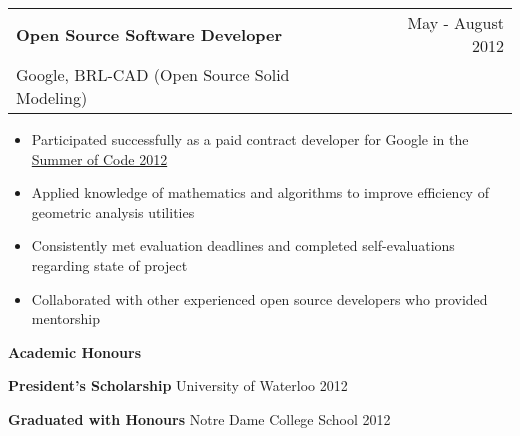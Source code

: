 \documentclass[10pt]{article}
\makeatletter
\newcommand{\resheading}[1]{{\large \colorbox{headercol}{\begin{minipage}{\textwidth}{\textbf{#1 \vphantom{p\^{E}}}}\end{minipage}}}}
\newcommand{\ressubheading}[3]{\item
\begin{tabular*}{7in}{l@{\extracolsep{\fill}}r}
    \textbf{#1} & #2 \\ #3
\end{tabular*}\vspace{-4pt}}
\newcommand{\resitem}[2]{\item{\textbf{#1} #2}}
\makeatother
\begin{document}
\begin{description}
    \ressubheading{Open Source Software Developer} {May - August 2012} {Google, BRL-CAD (Open Source Solid Modeling)}
    \begin{itemize}
        \item{Participated successfully as a paid contract developer for Google in the \href{https://google-melange.appspot.com/gsoc/homepage/google/gsoc2012}{Summer of Code 2012}}
        \item{Applied knowledge of mathematics and algorithms to improve efficiency of geometric analysis utilities}
        \item{Consistently met evaluation deadlines and completed self-evaluations regarding state of project}
        \item{Collaborated with other experienced open source developers who provided mentorship}
    \end{itemize}
\end{description}

\resheading{Academic Honours}
\begin{description}
    \resitem{President's Scholarship} {University of Waterloo \hfill 2012}
    \resitem{Graduated with Honours} {Notre Dame College School \hfill 2012}
\end{description}
\end{document}
